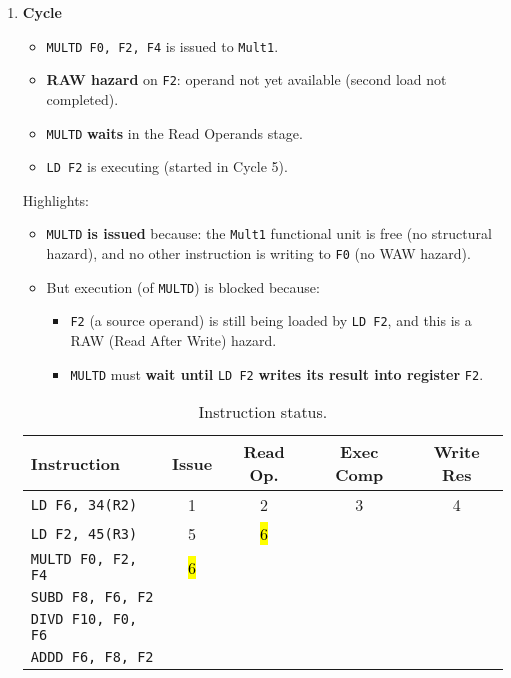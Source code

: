 \begin{enumerate}
    \newpage


    \item \textbf{Cycle \theenumi}
    \begin{itemize}
        \item[\textcolor{Green3}{\faIcon{check}}] \texttt{MULTD F0, F2, F4} is issued to \texttt{Mult1}.
        \item[\textcolor{Red2}{\faIcon{times}}] \textbf{RAW hazard} on \texttt{F2}: operand not yet available (second load not completed).
        \item \texttt{MULTD} \textbf{waits} in the Read Operands stage.
        \item \texttt{LD F2} is executing (started in Cycle 5).
    \end{itemize}
    Highlights:
    \begin{itemize}
        \item[\textcolor{Green3}{\faIcon{check}}] \texttt{MULTD} \textbf{is issued} because: the \texttt{Mult1} functional unit is free (no structural hazard), and no other instruction is writing to \texttt{F0} (no WAW hazard).
        \item[\textcolor{Red2}{\faIcon{times}}] But execution (of \texttt{MULTD}) is blocked because:
        \begin{itemize}
            \item \texttt{F2} (a source operand) is still being loaded by \texttt{LD F2}, and this is a RAW (Read After Write) hazard.
            \item \texttt{MULTD} must \textbf{wait until} \texttt{LD F2} \textbf{writes its result into register} \texttt{F2}.
        \end{itemize}
    \end{itemize}

    \begin{table}[!htp]
        \centering
        \begin{tabular}{@{} l | c c c c @{}}
            \toprule
            Instruction                 & Issue & Read Op.  & Exec Comp & Write Res \\
            \midrule
            \texttt{LD    F6, 34(R2)}   & 1     & 2         & 3         & 4         \\ [.3em]
            \texttt{LD    F2, 45(R3)}   & 5     & \hl{6}    &           &           \\ [.3em]
            \texttt{MULTD F0, F2, F4}   & \hl{6}&           &           &           \\ [.3em]
            \texttt{SUBD  F8, F6, F2}   &       &           &           &           \\ [.3em]
            \texttt{DIVD  F10, F0, F6}  &       &           &           &           \\ [.3em]
            \texttt{ADDD  F6, F8, F2}   &       &           &           &           \\
            \bottomrule
        \end{tabular}
        \caption*{Instruction status.}
    \end{table}


\end{enumerate}
